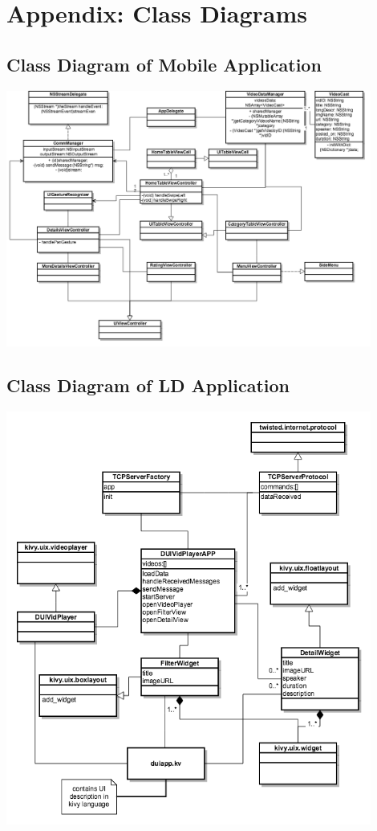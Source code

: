 \chapter{Appendix: Class Diagrams}\label{chapter:appendA}
\section{Class Diagram of Mobile Application}
\includegraphics[width=0.9\textwidth, center, center]{figures/class_diagramSD}
\newpage
\section{Class Diagram of LD Application}
\includegraphics[width=0.9\textwidth, center, center]{figures/class_diagramLD}
